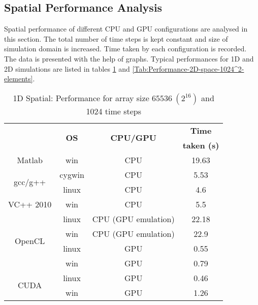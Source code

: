 \subsection{Spatial Performance Analysis}
Spatial performance of different CPU and GPU configurations are analysed in this section. The total number of time steps is kept constant and size of simulation domain is increased. Time taken by each configuration is recorded. The data is presented with the help of graphs. Typical performances for 1D and 2D simulations are listed in tables \ref{Tab:Performance-1D-space-65536-elements} and \ref{Tab:Performance-2D-space-1024^2-elements}.
\begin{table}[H]
\begin{center}
\vspace{0.3cm}
\SingleSpacing
	\begin{tabular}{cccc}
	\hline \hline
		\rule{0pt}{2.6ex} & \multirow{2}{*}{\textbf{OS}} & \multirow{2}{*}{\textbf{CPU/GPU}}  & \textbf{Time}\\
		& &  & \textbf{taken (s)}\\
		\hline
		Matlab \rule{0pt}{2.6ex} & win & CPU &19.63\\
		\hline
		\multirow{2}{*}{gcc/g++} \rule{0pt}{2.6ex} & cygwin & CPU &5.53\\
		& linux & CPU &4.6\\
		\hline
		VC++ 2010 \rule{0pt}{2.6ex} & win & CPU &5.5\\
		\hline
		\multirow{4}{*}{OpenCL} \rule{0pt}{2.6ex} & linux & CPU (GPU emulation) &22.18\\
		& win & CPU (GPU emulation) &22.9\\
		& linux & GPU &0.55\\
		& win & GPU &0.79\\
		\hline
		\multirow{2}{*}{CUDA} \rule{0pt}{2.6ex} & linux & GPU &0.46\\
		& win & GPU &1.26\\
	\hline \hline
	\end{tabular}
\end{center}
\caption{1D Spatial: Performance for array size $65536~(2^{16})$ and 1024 time steps}
\label{Tab:Performance-1D-space-65536-elements}
\end{table}
